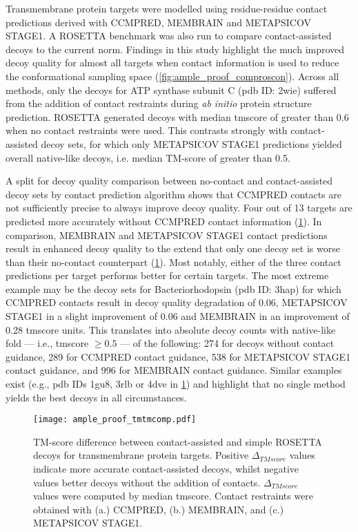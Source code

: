 Transmembrane protein targets were modelled using residue-residue contact predictions derived with CCMPRED, MEMBRAIN and METAPSICOV STAGE1. A ROSETTA benchmark was also run to compare contact-assisted decoys to the current norm. Findings in this study highlight the much improved decoy quality for almost all targets when contact information is used to reduce the conformational sampling space (\cref{fig:ample_proof_comproscon}). Across all methods, only the decoys for ATP synthase subunit C (\gls{pdb} ID: 2wie) suffered from the addition of contact restraints during \textit{ab initio} protein structure prediction. ROSETTA generated decoys with median \gls{tmscore} of greater than 0.6 when no contact restraints were used. This contrasts strongly with contact-assisted decoy sets, for which only METAPSICOV STAGE1 predictions yielded overall native-like decoys, i.e. median TM-score of greater than 0.5. 

A split for decoy quality comparison between no-contact and contact-assisted decoy sets by contact prediction algorithm shows that CCMPRED contacts are not sufficiently precise to always improve decoy quality. Four out of 13 targets are predicted more accurately without CCMPRED contact information (\cref{fig:ample_proof_tmtmcomp}). In comparison, MEMBRAIN and METAPSICOV STAGE1 contact predictions result in enhanced decoy quality to the extend that only one decoy set is worse than their no-contact counterpart (\cref{fig:ample_proof_tmtmcomp}). Most notably, either of the three contact predictions per target performs better for certain targets. The most extreme example may be the decoy sets for Bacteriorhodopsin (\gls{pdb} ID: 3hap) for which CCMPRED contacts result in decoy quality degradation of 0.06, METAPSICOV STAGE1 in a slight improvement of 0.06 and MEMBRAIN in an improvement of 0.28 \gls{tmscore} units. This translates into absolute decoy counts with native-like fold --- i.e., \gls{tmscore} $\geq 0.5$ --- of the following: 274 for decoys without contact guidance, 289 for CCMPRED contact guidance, 538 for METAPSICOV STAGE1 contact guidance, and 996 for MEMBRAIN contact guidance. Similar examples exist (e.g., \gls{pdb} IDs 1gu8, 3rlb or 4dve in \cref{fig:ample_proof_tmtmcomp}) and highlight that no single method yields the best decoys in all circumstances.

\begin{figure}[H]
    \centering
    \texttt{[image: ample\_proof\_tmtmcomp.pdf]}
    \caption[TM-score difference between contact-assisted and simple decoys]{TM-score difference between contact-assisted and simple ROSETTA decoys for transmembrane protein targets. Positive $\Delta_{TMscore}$ values indicate more accurate contact-assisted decoys, whilst negative values better decoys without the addition of contacts. $\Delta_{TMscore}$ values were computed by median \gls{tmscore}. Contact restraints were obtained with (a.) CCMPRED, (b.) MEMBRAIN, and (c.) METAPSICOV STAGE1.}
    \label{fig:ample_proof_tmtmcomp}
\end{figure}


